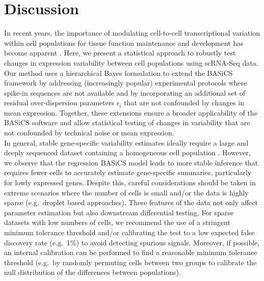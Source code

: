 
\section{Discussion}

In recent years, the importance of modulating cell-to-cell transcriptional variation within cell populations for tissue function maintenance and development has become apparent \citep{BaharHalpern2015, Mojtahedi2016, Goolam2016}. Here, we present a statistical approach to robustly test changes in expression variability between cell populations using scRNA-Seq data. Our method uses a hierarchical Bayes formulation to extend the BASiCS framework by addressing (increasingly popular) experimental protocols where spike-in sequences are not available and by incorporating an additional set of residual over-dispersion parameters $\epsilon_i$ that are not confounded by changes in mean expression. Together, these extensions ensure a broader applicability of the BASiCS software and allow statistical testing of changes in variability that are not confounded by technical noise or mean expression.  \\ 

In general, stable gene-specific variability estimates ideally require a large and deeply sequenced dataset containing a homogeneous cell population \citep[the use of unique molecular identifiers for quantifying transcript counts can also improve variability estimation, see][]{Grun2014}. However, we observe that the regression BASiCS model leads to more stable inference that requires fewer cells to accurately estimate gene-specific summaries, particularly for lowly expressed genes. Despite this, careful considerations should be taken in extreme scenarios where the number of cells is small and/or the data is highly sparse (e.g.~droplet based approaches). These features of the data not only affect parameter estimation but also downstream differential testing. For sparse datasets with low numbers of cells, we recommend the use of a stringent minimum tolerance threshold and/or calibrating the test to a low expected false discovery rate (e.g.~1\%) to avoid detecting spurious signals. Moreover, if possible, an internal calibration can be performed to find a reasonable minimum tolerance threshold (e.g.~by randomly permuting cells between two groups to calibrate the null distribution of the differences between populations). \\

